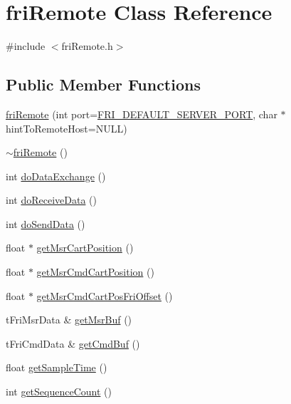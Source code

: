 \hypertarget{classfriRemote}{\section{fri\-Remote \-Class \-Reference}
\label{classfriRemote}
}


{\ttfamily \#include $<$fri\-Remote.\-h$>$}

\subsection*{\-Public \-Member \-Functions}
\begin{DoxyCompactItemize}
\item 
\hyperlink{group__friRemoteLib_ga02ad85347217300df8817d29e1787f56}{fri\-Remote} (int port=\hyperlink{group__friRemoteLib_ga0060efa69492840494ae541296595f88}{\-F\-R\-I\-\_\-\-D\-E\-F\-A\-U\-L\-T\-\_\-\-S\-E\-R\-V\-E\-R\-\_\-\-P\-O\-R\-T}, char $\ast$hint\-To\-Remote\-Host=\-N\-U\-L\-L)
\item 
\hyperlink{group__friRemoteLib_gafc7ac89e503183404b177474c9c9ebdb}{$\sim$fri\-Remote} ()
\item 
int \hyperlink{group__friRemoteLib_ga7024604f3303ecc18c40a331e3eae5a5}{do\-Data\-Exchange} ()
\item 
int \hyperlink{group__friRemoteLib_ga7207d9e5e884b3aa91fa78bb8758d8a3}{do\-Receive\-Data} ()
\item 
int \hyperlink{group__friRemoteLib_gac9f0e3e6b406f32cfc716900fac5e5f4}{do\-Send\-Data} ()
\item 
float $\ast$ \hyperlink{classfriRemote_a5533a65a7f5053da71a9ea191ae15bb3}{get\-Msr\-Cart\-Position} ()
\item 
float $\ast$ \hyperlink{classfriRemote_a7f6d2a7090437785bc75593116b484b5}{get\-Msr\-Cmd\-Cart\-Position} ()
\item 
float $\ast$ \hyperlink{classfriRemote_a846d8984ae995449139e887d1cca7b4e}{get\-Msr\-Cmd\-Cart\-Pos\-Fri\-Offset} ()
\item 
t\-Fri\-Msr\-Data \& \hyperlink{classfriRemote_a76de16fa0db3bcd0b9527519232c644b}{get\-Msr\-Buf} ()
\item 
t\-Fri\-Cmd\-Data \& \hyperlink{classfriRemote_a5ed9c4fc4edbb97c78424123c018fcc9}{get\-Cmd\-Buf} ()
\item 
float \hyperlink{classfriRemote_abb74fe05d82c8934404ced98c20e26b5}{get\-Sample\-Time} ()
\item 
int \hyperlink{classfriRemote_ac9aa66c3db08a02a82a4a5c01e0c8b76}{get\-Sequence\-Count} ()
\end{DoxyCompactItemize}
